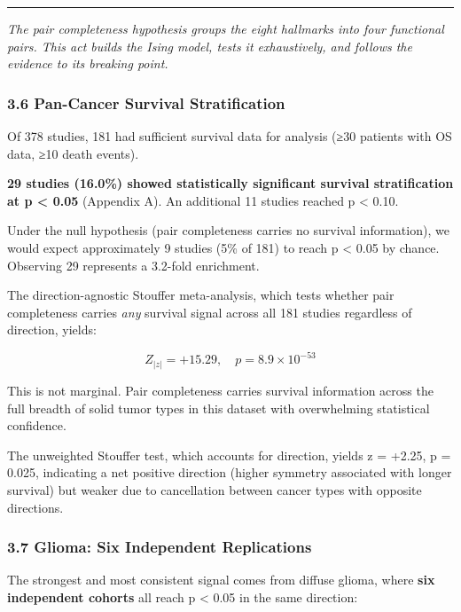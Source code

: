 \documentclass[
  11pt,
]{article}
\begin{document}
\begin{center}\rule{0.5\linewidth}{0.5pt}\end{center}

\emph{The pair completeness hypothesis groups the eight hallmarks into
four functional pairs. This act builds the Ising model, tests it
exhaustively, and follows the evidence to its breaking point.}

\subsubsection{3.6 Pan-Cancer Survival
Stratification}\label{pan-cancer-survival-stratification}

Of 378 studies, 181 had sufficient survival data for analysis (≥30
patients with OS data, ≥10 death events).

\textbf{29 studies (16.0\%) showed statistically significant survival
stratification at p \textless{} 0.05} (Appendix A). An additional 11
studies reached p \textless{} 0.10.

Under the null hypothesis (pair completeness carries no survival
information), we would expect approximately 9 studies (5\% of 181) to
reach p \textless{} 0.05 by chance. Observing 29 represents a 3.2-fold
enrichment.

The direction-agnostic Stouffer meta-analysis, which tests whether pair
completeness carries \emph{any} survival signal across all 181 studies
regardless of direction, yields:

\[Z_{|z|} = +15.29, \quad p = 8.9 \times 10^{-53} \tag{4}\]

This is not marginal. Pair completeness carries survival information
across the full breadth of solid tumor types in this dataset with
overwhelming statistical confidence.

The unweighted Stouffer test, which accounts for direction, yields z =
+2.25, p = 0.025, indicating a net positive direction (higher symmetry
associated with longer survival) but weaker due to cancellation between
cancer types with opposite directions.

\subsubsection{3.7 Glioma: Six Independent
Replications}\label{glioma-six-independent-replications}

The strongest and most consistent signal comes from diffuse glioma,
where \textbf{six independent cohorts} all reach p \textless{} 0.05 in
the same direction:
\end{document}
